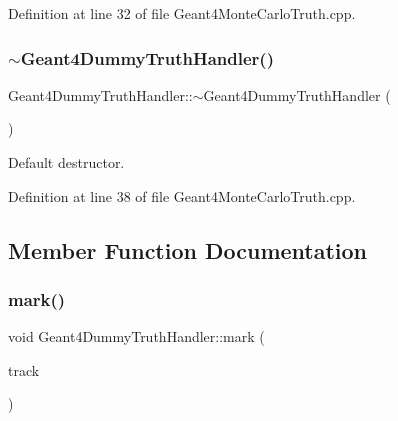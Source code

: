 Definition at line 32 of file Geant4\+Monte\+Carlo\+Truth.\+cpp.

\hypertarget{class_d_d4hep_1_1_simulation_1_1_geant4_dummy_truth_handler_ae5c0fe10becfd6ba266b4bbb1b56c253}{}\label{class_d_d4hep_1_1_simulation_1_1_geant4_dummy_truth_handler_ae5c0fe10becfd6ba266b4bbb1b56c253} 
\subsubsection{\texorpdfstring{$\sim$\+Geant4\+Dummy\+Truth\+Handler()}{~Geant4DummyTruthHandler()}}
{\footnotesize\ttfamily Geant4\+Dummy\+Truth\+Handler\+::$\sim$\+Geant4\+Dummy\+Truth\+Handler (\begin{DoxyParamCaption}{ }\end{DoxyParamCaption})\hspace{0.3cm}{\ttfamily [virtual]}}



Default destructor. 



Definition at line 38 of file Geant4\+Monte\+Carlo\+Truth.\+cpp.



\subsection{Member Function Documentation}
\hypertarget{class_d_d4hep_1_1_simulation_1_1_geant4_dummy_truth_handler_ae7540d20113834f5a31134df344813ad}{}\label{class_d_d4hep_1_1_simulation_1_1_geant4_dummy_truth_handler_ae7540d20113834f5a31134df344813ad} 
\subsubsection{\texorpdfstring{mark()}{mark()}\hspace{0.1cm}{\footnotesize\ttfamily [1/4]}}
{\footnotesize\ttfamily void Geant4\+Dummy\+Truth\+Handler\+::mark (\begin{DoxyParamCaption}\item[{const G4\+Track $\ast$}]{track }\end{DoxyParamCaption})\hspace{0.3cm}{\ttfamily [virtual]}}



